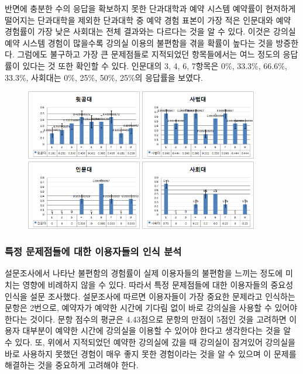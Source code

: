 \documentclass[11pt,a4paper]{article}
\begin{document}
반면에 충분한 수의 응답을 확보하지 못한 단과대학과 예약 시스템 예약률이
현저하게 떨어지는 단과대학을 제외한 단과대학 중 예약 경험 표본이 가장 적은
인문대와 예약 경험률이 가장 낮은 사회대는 전체 결과와는 다르다는 것을 알 수
있다. 이것은 강의실 예약 시스템 경험이 많을수록 강의실 이용의 불편함을 겪을
확률이 높다는 것을 방증한다. 그럼에도 불구하고 가장 큰 문제점들로 지적되었던
항목들에서는 여느 정도의 응답률이 있다는 것 또한 확인할 수 있다. 인문대의 3, 4,
6, 7항목은 0\%, 33.3\%, 66.6\%, 33.3\%, 사회대는 0\%, 25\%, 50\%, 25\%의
응답률을 보였다.
\begin{figure}[h]
\includegraphics[width=0.45\textwidth]{4_1_3_1}
\includegraphics[width=0.45\textwidth]{4_1_3_2}
\includegraphics[width=0.45\textwidth]{4_1_3_3}
\includegraphics[width=0.45\textwidth]{4_1_3_4}
\centering
\end{figure}

\subsubsection{특정 문제점들에 대한 이용자들의 인식 분석}
설문조사에서 나타난 불편함의 경험률이 실제 이용자들의 불편함을 느끼는 정도에
미치는 영향에 비례하지 않을 수 있다. 따라서 특정 문제점들에 대한 이용자들의
중요성 인식을 설문 조사했다. 설문조사에 따르면 이용자들이 가장 중요한 문제라고
인식하는 문항은 2번으로, 예약자가 예약한 시간에 기다림 없이 바로 강의실을
사용할 수 있어야 한다는 것이다. 문항 점수의 평균은 4.43점으로 문항의 만점이
5점인 것을 고려하면 이용자 대부분이 예약한 시간에 강의실을 이용할 수 있어야
한다고 생각한다는 것을 알 수 있다. 또, 위에서 지적되었던 예약한 강의실에 갔을
때 강의실이 잠겨있어 강의실을 바로 사용하지 못했던 경험이 매우 좋지 못한
경험이라는 것을 알 수 있으며 이 문제를 해결하는 것을 중요하게 고려해야 한다.
\end{document}
